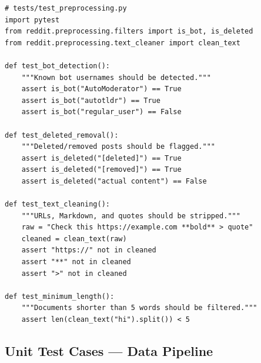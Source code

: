 \documentclass[12pt, letterpaper]{article}
\begin{document}
\begin{lstlisting}[caption={Example pytest unit test for Reddit preprocessing}, label=lst:test_example]
# tests/test_preprocessing.py
import pytest
from reddit.preprocessing.filters import is_bot, is_deleted
from reddit.preprocessing.text_cleaner import clean_text

def test_bot_detection():
    """Known bot usernames should be detected."""
    assert is_bot("AutoModerator") == True
    assert is_bot("autotldr") == True
    assert is_bot("regular_user") == False

def test_deleted_removal():
    """Deleted/removed posts should be flagged."""
    assert is_deleted("[deleted]") == True
    assert is_deleted("[removed]") == True
    assert is_deleted("actual content") == False

def test_text_cleaning():
    """URLs, Markdown, and quotes should be stripped."""
    raw = "Check this https://example.com **bold** > quote"
    cleaned = clean_text(raw)
    assert "https://" not in cleaned
    assert "**" not in cleaned
    assert ">" not in cleaned

def test_minimum_length():
    """Documents shorter than 5 words should be filtered."""
    assert len(clean_text("hi").split()) < 5
\end{lstlisting}

\subsection{Unit Test Cases --- Data Pipeline}
\end{document}

